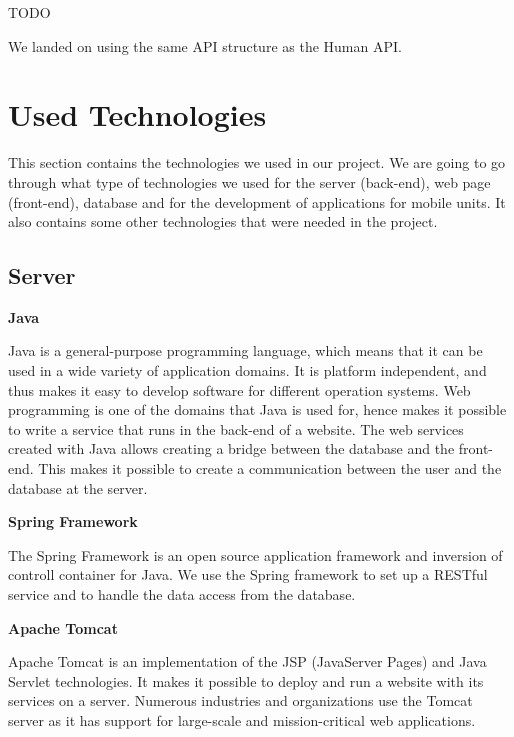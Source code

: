 TODO

We landed on using the same API structure as the Human API.


\section{Used Technologies}
\label{section:used-technologies}

This section contains the technologies we used in our project.
We are going to go through what type of technologies we used for the server (back-end), web page (front-end), database and for the development of applications for mobile units. 
It also contains some other technologies that were needed in the project.

\subsection{Server}

\textbf{Java} \nocite{Java}

Java is a general-purpose programming language, which means that it can be used in a wide variety of application domains.
It is platform independent, and thus makes it easy to develop software for different operation systems.
Web programming is one of the domains that Java is used for, hence makes it possible to write a service that runs in the back-end of a website.
The web services created with Java allows creating a bridge between the database and the front-end. 
This makes it possible to create a communication between the user and the database at the server.

\textbf{Spring Framework} \nocite{SpringFramework1}\nocite{SpringFramework2}

The Spring Framework is an open source application framework and inversion of controll container for Java. 
We use the Spring framework to set up a RESTful service and to handle the data access from the database. 

\textbf{Apache Tomcat} \nocite{ApacheTomcat}

Apache Tomcat is an implementation of the JSP (JavaServer Pages) and Java Servlet technologies.
It makes it possible to deploy and run a website with its services on a server.
Numerous industries and organizations use the Tomcat server as it has support for large-scale and mission-critical web applications.

